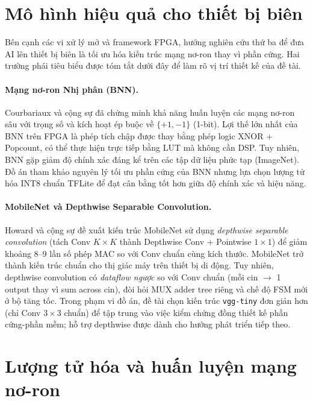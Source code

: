 \newpage
\section{Mô hình hiệu quả cho thiết bị biên}
\label{sec:efficient_models}

Bên cạnh các vi xử lý mở và framework FPGA, hướng nghiên cứu thứ ba để đưa AI lên thiết bị biên là tối ưu hóa kiến trúc mạng nơ-ron thay vì phần cứng. Hai trường phái tiêu biểu được tóm tắt dưới đây để làm rõ vị trí thiết kế của đề tài.

\paragraph{Mạng nơ-ron Nhị phân (BNN).} Courbariaux và cộng sự \cite{bnn_courbariaux} đã chứng minh khả năng huấn luyện các mạng nơ-ron sâu với trọng số và kích hoạt ép buộc về $\{+1, -1\}$ (1-bit). Lợi thế lớn nhất của BNN trên FPGA là phép tích chập được thay bằng phép logic XNOR + Popcount, có thể thực hiện trực tiếp bằng LUT mà không cần DSP. Tuy nhiên, BNN gặp giảm độ chính xác đáng kể trên các tập dữ liệu phức tạp (ImageNet). Đồ án tham khảo nguyên lý tối ưu phần cứng của BNN nhưng lựa chọn lượng tử hóa INT8 chuẩn TFLite \cite{jacob2018quantization} để đạt cân bằng tốt hơn giữa độ chính xác và hiệu năng.

\paragraph{MobileNet và Depthwise Separable Convolution.} Howard và cộng sự \cite{mobilenet_v1} đề xuất kiến trúc MobileNet sử dụng \textit{depthwise separable convolution} (tách Conv $K \times K$ thành Depthwise Conv + Pointwise $1 \times 1$) để giảm khoảng 8--9 lần số phép MAC so với Conv chuẩn cùng kích thước. MobileNet trở thành kiến trúc chuẩn cho thị giác máy trên thiết bị di động. Tuy nhiên, depthwise convolution có \textit{dataflow ngược} so với Conv chuẩn (mỗi cin $\to$ 1 output thay vì sum across cin), đòi hỏi MUX adder tree riêng và chế độ FSM mới ở bộ tăng tốc. Trong phạm vi đồ án, đề tài chọn kiến trúc \texttt{vgg-tiny} đơn giản hơn (chỉ Conv $3 \times 3$ chuẩn) để tập trung vào việc kiểm chứng đồng thiết kế phần cứng-phần mềm; hỗ trợ depthwise được dành cho hướng phát triển tiếp theo.

\section{Lượng tử hóa và huấn luyện mạng nơ-ron}
\label{sec:quantization_theory}

